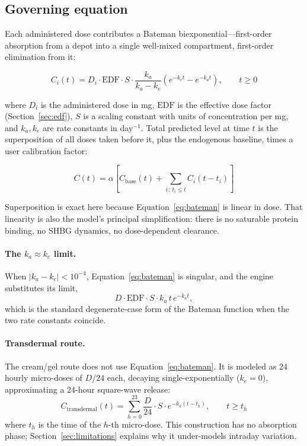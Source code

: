 \documentclass[11pt,a4paper]{article}
\begin{document}
\subsection{Governing equation}
\label{sec:governing}

Each administered dose contributes a Bateman biexponential---first-order
absorption from a depot into a single well-mixed compartment, first-order
elimination from it:

\begin{equation}
C_i(t) = D_i \cdot \mathrm{EDF} \cdot S \cdot
         \frac{k_a}{k_a - k_e}\left(e^{-k_e t} - e^{-k_a t}\right),
         \qquad t \ge 0
\label{eq:bateman}
\end{equation}

where $D_i$ is the administered dose in mg, $\mathrm{EDF}$ is the
effective dose factor (Section~\ref{sec:edf}), $S$ is a scaling constant
with units of concentration per mg, and $k_a, k_e$ are rate constants in
day$^{-1}$. Total predicted level at time $t$ is the superposition of
all doses taken before it, plus the endogenous baseline, times a user
calibration factor:

\begin{equation}
C(t) = \alpha\left[C_{\text{base}}(t) + \sum_{i \,:\, t_i \le t} C_i(t - t_i)\right]
\label{eq:superposition}
\end{equation}

Superposition is exact here because Equation~\ref{eq:bateman} is linear
in dose. That linearity is also the model's principal simplification:
there is no saturable protein binding, no SHBG dynamics, no
dose-dependent clearance.

\paragraph{The $k_a \approx k_e$ limit.} When $|k_a - k_e| < 10^{-4}$,
Equation~\ref{eq:bateman} is singular, and the engine substitutes its
limit,
\[
D \cdot \mathrm{EDF} \cdot S \cdot k_a\, t\, e^{-k_a t},
\]
which is the standard degenerate-case form of the Bateman function when
the two rate constants coincide.

\paragraph{Transdermal route.} The cream/gel route does not use
Equation~\ref{eq:bateman}. It is modeled as 24 hourly micro-doses of
$D/24$ each, decaying single-exponentially ($k_e = 0$), approximating a
24-hour square-wave release:
\begin{equation}
C_{\text{transdermal}}(t) = \sum_{h=0}^{23} \frac{D}{24} \cdot S \cdot e^{-k_a (t - t_h)},
\qquad t \ge t_h
\label{eq:transdermal}
\end{equation}
where $t_h$ is the time of the $h$-th micro-dose. This construction has
no absorption phase; Section~\ref{sec:limitations} explains why it
under-models intraday variation.
\end{document}
